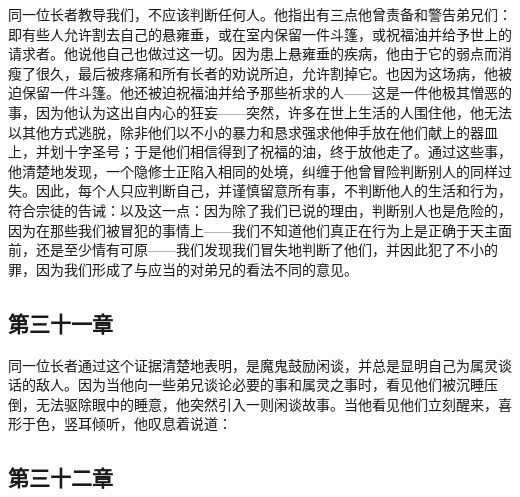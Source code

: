 \par

同一位长者教导我们，不应该判断任何人。他指出有三点他曾责备和警告弟兄们：即有些人允许割去自己的悬雍垂，或在室内保留一件斗篷，或祝福油并给予世上的请求者。他说他自己也做过这一切。因为患上悬雍垂的疾病，他由于它的弱点而消瘦了很久，最后被疼痛和所有长者的劝说所迫，允许割掉它。也因为这场病，他被迫保留一件斗篷。他还被迫祝福油并给予那些祈求的人——这是一件他极其憎恶的事，因为他认为这出自内心的狂妄——突然，许多在世上生活的人围住他，他无法以其他方式逃脱，除非他们以不小的暴力和恳求强求他伸手放在他们献上的器皿上，并划十字圣号；于是他们相信得到了祝福的油，终于放他走了。通过这些事，他清楚地发现，一个隐修士正陷入相同的处境，纠缠于他曾冒险判断别人的同样过失。因此，每个人只应判断自己，并谨慎留意所有事，不判断他人的生活和行为，符合宗徒的告诫：以及这一点：因为除了我们已说的理由，判断别人也是危险的，因为在那些我们被冒犯的事情上——我们不知道他们真正在行为上是正确于天主面前，还是至少情有可原——我们发现我们冒失地判断了他们，并因此犯了不小的罪，因为我们形成了与应当的对弟兄的看法不同的意见。\par


\subsection{第三十一章}

\par

同一位长者通过这个证据清楚地表明，是魔鬼鼓励闲谈，并总是显明自己为属灵谈话的敌人。因为当他向一些弟兄谈论必要的事和属灵之事时，看见他们被沉睡压倒，无法驱除眼中的睡意，他突然引入一则闲谈故事。当他看见他们立刻醒来，喜形于色，竖耳倾听，他叹息着说道：\par


\subsection{第三十二章}

